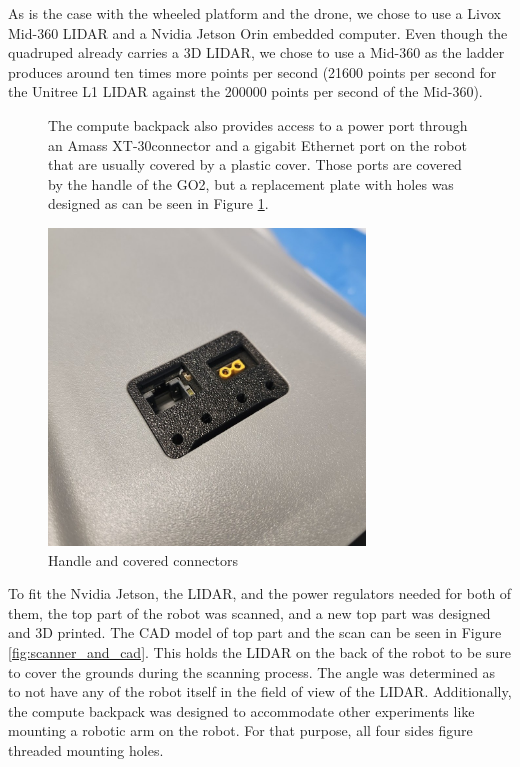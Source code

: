 \documentclass[12pt]{article}
\begin{document}
        As is the case with the wheeled platform and the drone, we chose to use a Livox Mid-360 LIDAR and a Nvidia Jetson Orin embedded computer. Even though the quadruped already carries a 3D LIDAR, we chose to use a Mid-360 as the ladder produces around ten times more points per second (21600 points per second for the Unitree L1 LIDAR against the 200000 points per second of the Mid-360).

        \begin{figure}[H]
            \centering
            \begin{minipage}{0.45\textwidth}
                The compute backpack also provides access to a power port through an Amass XT-30connector and a gigabit Ethernet port on the robot that are usually covered by a plastic cover. Those ports are covered by the handle of the GO2, but a replacement plate with holes was designed as can be seen in Figure \ref{fig:handle_cover}.
            \end{minipage}%
            \hfill
            \begin{minipage}{0.5\textwidth}
                \centering
                \includegraphics[width=0.75\textwidth]{Images/PortsWithCover.jpg}
                \caption{Handle and covered connectors}
                \label{fig:handle_cover}
            \end{minipage}
        \end{figure}
        To fit the Nvidia Jetson, the LIDAR, and the power regulators needed for both of them, the top part of the robot was scanned, and a new top part was designed and 3D printed. The CAD model of top part and the scan can be seen in Figure \ref{fig:scanner_and_cad}. This holds the LIDAR on the back of the robot to be sure to cover the grounds during the scanning process. The angle was determined as to not have any of the robot itself in the field of view of the LIDAR. Additionally, the compute backpack was designed to accommodate other experiments like mounting a robotic arm on the robot. For that purpose, all four sides figure threaded mounting holes.
\end{document}
